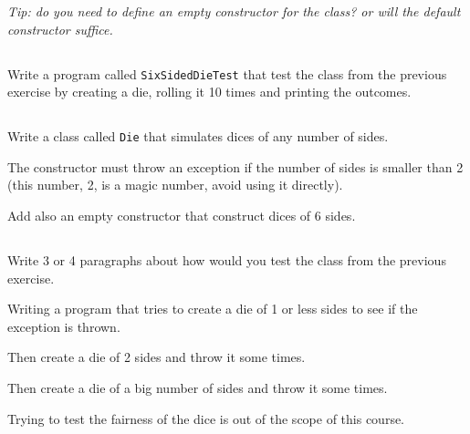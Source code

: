\documentclass[a4paper, 11pt]{article}
\begin{document}
\textsl{Tip: do you need to define an empty constructor for the class? or will
the default constructor suffice.}




\subsection{}

Write a program called \texttt{SixSidedDieTest} that test the class from the
previous exercise by creating a die, rolling it 10 times and printing the
outcomes.







\subsection{}

Write a class called \texttt{Die} that simulates dices of any number of sides.

The constructor must throw an exception if the number of sides is smaller than
2 (this number, 2, is a magic number, avoid using it directly).

Add also an empty constructor that construct dices of 6 sides.





\subsection{}

Write 3 or 4 paragraphs about how would you test the class from the previous
exercise.

\begin{solution}
Writing a program that tries to create a die of 1 or less sides
to see if the exception is thrown.

Then create a die of 2 sides and throw it some times.

Then create a die of a big number of sides and throw it some times.

Trying to test the fairness of the dice is out of the scope of this course.
\end{solution}
\end{document}
